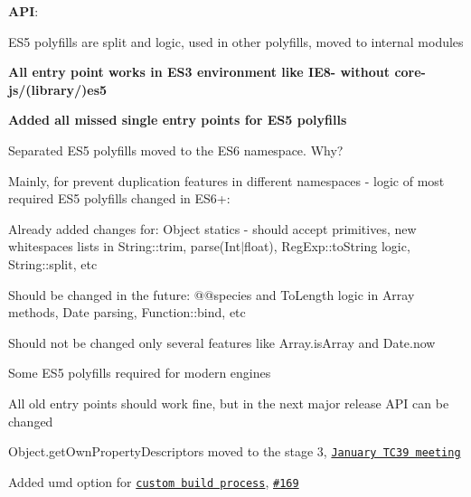 \begin{DoxyItemize}
\item {\bfseries A\+PI}\+:
\begin{DoxyItemize}
\item E\+S5 polyfills are split and logic, used in other polyfills, moved to internal modules
\begin{DoxyItemize}
\item {\bfseries All entry point works in E\+S3 environment like I\+E8-\/ without {\ttfamily core-\/js/(library/)es5}}
\item {\bfseries Added all missed single entry points for E\+S5 polyfills}
\item Separated E\+S5 polyfills moved to the E\+S6 namespace. Why?
\begin{DoxyItemize}
\item Mainly, for prevent duplication features in different namespaces -\/ logic of most required E\+S5 polyfills changed in E\+S6+\+:
\begin{DoxyItemize}
\item Already added changes for\+: {\ttfamily Object} statics -\/ should accept primitives, new whitespaces lists in {\ttfamily String\+::trim}, {\ttfamily parse(Int$\vert$float)}, {\ttfamily Reg\+Exp\+::to\+String} logic, {\ttfamily String\+::split}, etc
\item Should be changed in the future\+: {\ttfamily @@species} and {\ttfamily To\+Length} logic in {\ttfamily Array} methods, {\ttfamily Date} parsing, {\ttfamily Function\+::bind}, etc
\item Should not be changed only several features like {\ttfamily Array.\+is\+Array} and {\ttfamily Date.\+now}
\end{DoxyItemize}
\item Some E\+S5 polyfills required for modern engines
\end{DoxyItemize}
\item All old entry points should work fine, but in the next major release A\+PI can be changed
\end{DoxyItemize}
\item {\ttfamily Object.\+get\+Own\+Property\+Descriptors} moved to the stage 3, \href{https://github.com/rwaldron/tc39-notes/blob/master/es7/2016-01/2016-01-28.md#objectgetownpropertydescriptors-to-stage-3-jordan-harband-low-priority-but-super-quick}{\tt January T\+C39 meeting}
\item Added {\ttfamily umd} option for \href{https://github.com/zloirock/core-js#custom-build-from-external-scripts}{\tt custom build process}, \href{https://github.com/zloirock/core-js/issues/169}{\tt \#169}

\end{DoxyItemize}
\end{DoxyItemize}
